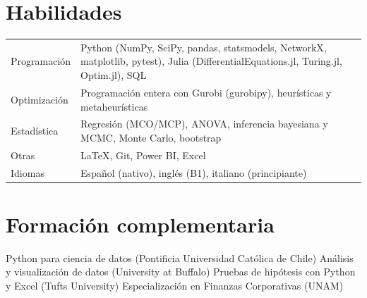 \documentclass[11pt,a4paper]{article}
\begin{document}
\section{Habilidades}
\begin{tabularx}{\textwidth}{@{}p{3.2cm}X@{}}
  Programaci\'on & Python (NumPy, SciPy, pandas, statsmodels, NetworkX, matplotlib, pytest),
                Julia (DifferentialEquations.jl, Turing.jl, Optim.jl), SQL \\
  Optimizaci\'on & Programaci\'on entera con Gurobi (gurobipy), heur\'isticas y metaheur\'isticas \\
  Estad\'istica & Regresi\'on (MCO/MCP), ANOVA, inferencia bayesiana y MCMC, Monte Carlo, bootstrap \\
  Otras & \LaTeX, Git, Power BI, Excel \\
  Idiomas & Espa\~nol (nativo), ingl\'es (B1), italiano (principiante)
\end{tabularx}

\section{Formaci\'on complementaria}
Python para ciencia de datos (Pontificia Universidad Cat\'olica de Chile) \textperiodcentered{}
An\'alisis y visualizaci\'on de datos (University at Buffalo) \textperiodcentered{}
Pruebas de hip\'otesis con Python y Excel (Tufts University) \textperiodcentered{}
Especializaci\'on en Finanzas Corporativas (UNAM)
\end{document}
